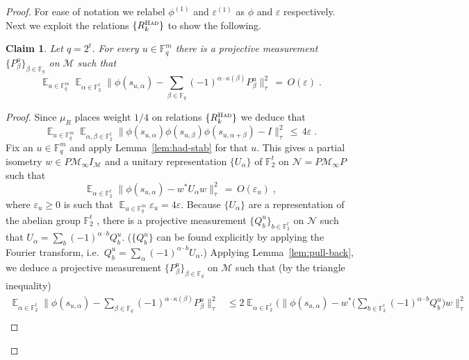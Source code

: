 \documentclass[11pt]{article}
\newtheorem{claim}[theorem]{Claim}
\theoremstyle{definition}
\newcommand{\Id}{\ensuremath{I}}
\DeclareMathOperator*{\Expectation}{\mathbb{E}}
\newcommand{\Es}[1]{\Expectation_{#1}}
\newcommand{\F}{\ensuremath{\mathbb{F}}}
\newcommand{\Z}{\ensuremath{\mathbb{Z}}}
\newcommand{\mM}{\ensuremath{\mathcal{M}}}
\newcommand{\had}{\textsc{Had}}
\newcommand{\eps}{\varepsilon}
\newcommand{\mN}{\mathcal{N}}
\begin{document}
\begin{proof}
For ease of notation we relabel $\phi^{(1)}$ and $\eps^{(1)}$ as $\phi$ and $\eps$ respectively. Next we exploit the relations $\{R^\had_k\}$ to show the following. 

\begin{claim}\label{claim:z2-stab-2}
Let $q=2^t$. 
For every $u\in \F_q^m$ there is a projective measurement $\{P^u_\beta\}_{\beta\in \F_{q}}$ on $\mM$ such that 
\begin{equation}\label{eq:z2-stab-2}
 \Es{u\in \F_q^m} \Es{\alpha\in \F_2^t} \Big\| \phi(s_{u,\alpha}) - \sum_{\beta\in\F_q} (-1)^{\alpha \cdot \kappa(\beta)} P^u_\beta \Big\|_\tau^2 \,=\, O(\eps)\;. 
\end{equation}
\end{claim}

\begin{proof}
Since $\mu_R$ places weight $1/4$ on relations $\{R^\had_k\}$ we deduce that 
\begin{equation}\label{eq:stab-rm-1}
\Es{u\in \F_q^m} \Es{\alpha,\beta\in \F_2^t} \big\|\phi(s_{u,\alpha})\phi(s_{u,\beta})\phi(s_{u,\alpha+\beta})-\Id\big\|_\tau^2 \,\leq\, 4\eps\;. 
\end{equation}
Fix an $u\in \F_q^m$ and apply Lemma~\ref{lem:had-stab} for that $u$. This gives a partial isometry $w\in P\mM_\infty\Id_\mM$ and a unitary representation $\{U_\alpha\}$ of $\F_2^t$ \hnote{should be $\Z_2^t$?} on $\mN=P\mM_\infty P$ such that 
\begin{equation}\label{eq:stab-rm-1b}
 \Es{\alpha \in \F_2^t} \big\| \phi(s_{u,\alpha}) - w^* U_\alpha w \big\|_\tau^2 \,=\, O(\eps_u)\;,
\end{equation}
where $\eps_u\geq 0$ is such that $\Es{u\in \F_q^m} \eps_u = 4\eps$. Because $\{U_\alpha\}$ are a representation of the abelian group $\F_2^t$ , there is a projective measurement $\{Q^u_b\}_{b\in \F_2^t}$ on $\mN$ such that $U_\alpha = \sum_b (-1)^{\alpha\cdot b} Q^u_b$. ($\{Q^u_b\}$ can be found explicitly by applying the Fourier transform, i.e.\ $Q^u_b = \sum_\alpha (-1)^{\alpha \cdot b} U_\alpha$.) Applying Lemma~\ref{lem:pull-back}, we deduce a projective measurement $\{P^u_\beta\}_{\beta\in \F_q}$ on $\mM$ such that (by the triangle inequality)
\begin{align*}
 \Es{\alpha \in \F_2^t} \Big\| \phi(s_{u,\alpha}) - \sum_{\beta\in\F_q} (-1)^{\alpha \cdot \kappa(\beta)} P^u_\beta \Big\|_\tau^2
&\leq 2 \Es{\alpha \in \F_2^t} \Big( \Big\| \phi(s_{u,\alpha}) - w^*\Big(\sum_{b\in\F_2^t} (-1)^{\alpha \cdot b} Q^u_b \Big) w \Big\|_\tau^2 \\

\end{align*}
\end{proof}
\end{proof}
\end{document}

